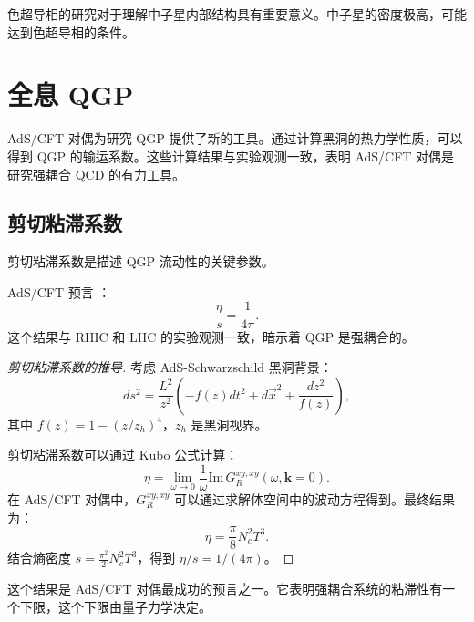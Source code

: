 \begin{remark}
色超导相的研究对于理解中子星内部结构具有重要意义。中子星的密度极高，可能达到色超导相的条件。
\end{remark}

\section{全息 QGP}

AdS/CFT 对偶为研究 QGP 提供了新的工具。通过计算黑洞的热力学性质，可以得到 QGP 的输运系数。这些计算结果与实验观测一致，表明 AdS/CFT 对偶是研究强耦合 QCD 的有力工具。

\subsection{剪切粘滞系数}

剪切粘滞系数是描述 QGP 流动性的关键参数。

\begin{theorem}
AdS/CFT 预言 \cite{Policastro2001}：
\begin{equation}
    \frac{\eta}{s} = \frac{1}{4\pi}.
\end{equation}
这个结果与 RHIC 和 LHC 的实验观测一致，暗示着 QGP 是强耦合的。
\end{theorem}

\begin{proof}[剪切粘滞系数的推导]
考虑 AdS-Schwarzschild 黑洞背景：
\begin{equation}
    ds^2 = \frac{L^2}{z^2} \left( -f(z)dt^2 + d\vec{x}^2 + \frac{dz^2}{f(z)} \right),
\end{equation}
其中 $f(z) = 1 - (z/z_h)^4$，$z_h$ 是黑洞视界。

剪切粘滞系数可以通过 Kubo 公式计算：
\begin{equation}
    \eta = \lim_{\omega \to 0} \frac{1}{\omega} \text{Im} \, G_R^{xy,xy}(\omega, \mathbf{k}=0).
\end{equation}
在 AdS/CFT 对偶中，$G_R^{xy,xy}$ 可以通过求解体空间中的波动方程得到。最终结果为：
\begin{equation}
    \eta = \frac{\pi}{8} N_c^2 T^3.
\end{equation}
结合熵密度 $s = \frac{\pi^2}{2} N_c^2 T^3$，得到 $\eta/s = 1/(4\pi)$。
\end{proof}

\begin{remark}
这个结果是 AdS/CFT 对偶最成功的预言之一。它表明强耦合系统的粘滞性有一个下限，这个下限由量子力学决定。
\end{remark}

